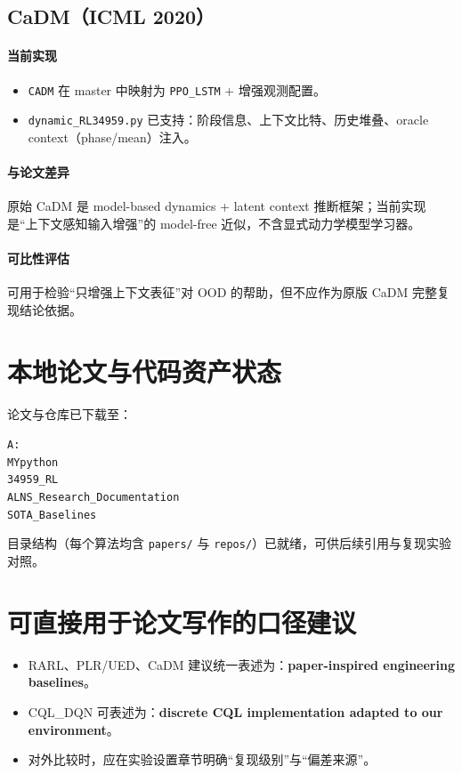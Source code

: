 ﻿\documentclass[12pt,a4paper]{ctexart}
\begin{document}
\subsection{CaDM（ICML 2020）}
\paragraph{当前实现}
\begin{itemize}
  \item \texttt{CADM} 在 master 中映射为 \texttt{PPO\_LSTM} + 增强观测配置。
  \item \texttt{dynamic\_RL34959.py} 已支持：阶段信息、上下文比特、历史堆叠、oracle context（phase/mean）注入。
\end{itemize}

\paragraph{与论文差异}
原始 CaDM 是 model-based dynamics + latent context 推断框架；当前实现是“上下文感知输入增强”的 model-free 近似，不含显式动力学模型学习器。

\paragraph{可比性评估}
可用于检验“只增强上下文表征”对 OOD 的帮助，但不应作为原版 CaDM 完整复现结论依据。

\section{本地论文与代码资产状态}
论文与仓库已下载至：
\begin{center}
\texttt{A:\\MYpython\\34959\_RL\\ALNS\_Research\_Documentation\\SOTA\_Baselines}
\end{center}

目录结构（每个算法均含 \texttt{papers/} 与 \texttt{repos/}）已就绪，可供后续引用与复现实验对照。

\section{可直接用于论文写作的口径建议}
\begin{itemize}
  \item RARL、PLR/UED、CaDM 建议统一表述为：\textbf{paper-inspired engineering baselines}。
  \item CQL\_DQN 可表述为：\textbf{discrete CQL implementation adapted to our environment}。
  \item 对外比较时，应在实验设置章节明确“复现级别”与“偏差来源”。
\end{itemize}
\end{document}
